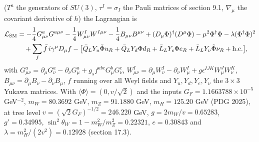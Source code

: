 \documentclass[10pt,a4paper]{article}
\begin{document}
($T^a$ the generators of $SU(3)$, $\tau^I=\sigma_I$ the Pauli matrices of section 9.1, $\nabla_\mu$ the covariant derivative of $h$) the Lagrangian is
\begin{align*}
\mathcal L_{\rm SM}&=-\frac14G^a_{\mu\nu}G^{a\mu\nu}-\frac14W^I_{\mu\nu}W^{I\mu\nu}-\frac14B_{\mu\nu}B^{\mu\nu}+(D_\mu\Phi)^\dagger(D^\mu\Phi)-\mu^2\Phi^\dagger\Phi-\lambda(\Phi^\dagger\Phi)^2 \\
&\quad+\sum_f\bar f\,i\gamma^\mu D_\mu f-\big[\bar Q_LY_u\tilde\Phi u_R+\bar Q_LY_d\Phi d_R+\bar L_LY_e\Phi e_R+\bar L_LY_\nu\tilde\Phi\nu_R+\text{h.c.}\big],
\end{align*}
with $G^a_{\mu\nu}=\partial_\mu G^a_\nu-\partial_\nu G^a_\mu+g_sf^{abc}G^b_\mu G^c_\nu$, $W^I_{\mu\nu}=\partial_\mu W^I_\nu-\partial_\nu W^I_\mu+g\epsilon^{IJK}W^J_\mu W^K_\nu$, $B_{\mu\nu}=\partial_\mu B_\nu-\partial_\nu B_\mu$, $f$ running over all Weyl fields and $Y_u,Y_d,Y_e,Y_\nu$ the $3\times3$ Yukawa matrices. With $\langle\Phi\rangle=(0,v/\sqrt2)$ and the inputs $G_F=1.1663788\times10^{-5}$ GeV$^{-2}$, $m_W=80.3692$ GeV, $m_Z=91.1880$ GeV, $m_H=125.20$ GeV (PDG 2025), at tree level $v=(\sqrt2G_F)^{-1/2}=246.220$ GeV, $g=2m_W/v=0.65283$, $g'=0.34995$, $\sin^2\theta_W=1-m_W^2/m_Z^2=0.22321$, $e=0.30843$ and $\lambda=m_H^2/(2v^2)=0.12928$ (section 17.3).
\end{document}
